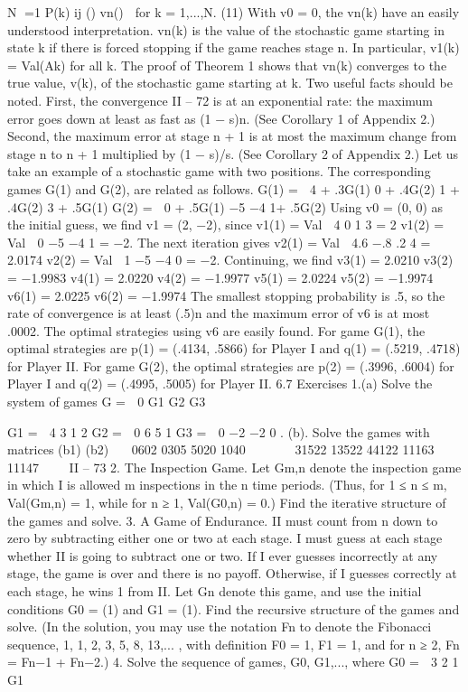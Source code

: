 N
=1
P(k)
ij () vn()

for k = 1,...,N. (11)
With v0 = 0, the vn(k) have an easily understood interpretation. vn(k) is the value of the
stochastic game starting in state k if there is forced stopping if the game reaches stage n.
In particular, v1(k) = Val(Ak) for all k.
The proof of Theorem 1 shows that vn(k) converges to the true value, v(k), of the
stochastic game starting at k. Two useful facts should be noted. First, the convergence
II – 72
is at an exponential rate: the maximum error goes down at least as fast as (1 − s)n.
(See Corollary 1 of Appendix 2.) Second, the maximum error at stage n + 1 is at most
the maximum change from stage n to n + 1 multiplied by (1 − s)/s. (See Corollary 2 of
Appendix 2.)
Let us take an example of a stochastic game with two positions. The corresponding
games G(1) and G(2), are related as follows.
G(1) =
 4 + .3G(1) 0 + .4G(2)
1 + .4G(2) 3 + .5G(1)
G(2) =
 0 + .5G(1) −5
−4 1+ .5G(2)
Using v0 = (0, 0) as the initial guess, we find v1 = (2, −2), since
v1(1) = Val  4 0
1 3
= 2 v1(2) = Val  0 −5
−4 1
= −2.
The next iteration gives
v2(1) = Val  4.6 −.8
.2 4
= 2.0174 v2(2) = Val  1 −5
−4 0
= −2.
Continuing, we find
v3(1) = 2.0210 v3(2) = −1.9983
v4(1) = 2.0220 v4(2) = −1.9977
v5(1) = 2.0224 v5(2) = −1.9974
v6(1) = 2.0225 v6(2) = −1.9974
The smallest stopping probability is .5, so the rate of convergence is at least (.5)n and the
maximum error of v6 is at most .0002.
The optimal strategies using v6 are easily found. For game G(1), the optimal strategies
are p(1) = (.4134, .5866) for Player I and q(1) = (.5219, .4718) for Player II. For game G(2),
the optimal strategies are p(2) = (.3996, .6004) for Player I and q(2) = (.4995, .5005) for
Player II.
6.7 Exercises
1.(a) Solve the system of games
G =
 0 G1
G2 G3

G1 =
 4 3
1 2
G2 =
 0 6
5 1
G3 =
 0 −2
−2 0
.
(b). Solve the games with matrices
(b1) (b2)
⎛
⎜⎝
0602
0305
5020
1040
⎞
⎟⎠
⎛
⎜⎜⎜⎝
31522
13522
44122
11163
11147
⎞
⎟⎟⎟⎠
II – 73
2. The Inspection Game. Let Gm,n denote the inspection game in which I is
allowed m inspections in the n time periods. (Thus, for 1 ≤ n ≤ m, Val(Gm,n) = 1, while
for n ≥ 1, Val(G0,n) = 0.) Find the iterative structure of the games and solve.
3. A Game of Endurance. II must count from n down to zero by subtracting
either one or two at each stage. I must guess at each stage whether II is going to subtract
one or two. If I ever guesses incorrectly at any stage, the game is over and there is no
payoff. Otherwise, if I guesses correctly at each stage, he wins 1 from II. Let Gn denote
this game, and use the initial conditions G0 = (1) and G1 = (1). Find the recursive
structure of the games and solve. (In the solution, you may use the notation Fn to denote
the Fibonacci sequence, 1, 1, 2, 3, 5, 8, 13,... , with definition F0 = 1, F1 = 1, and for
n ≥ 2, Fn = Fn−1 + Fn−2.)
4. Solve the sequence of games, G0, G1,..., where
G0 =
 3 2
1 G1

